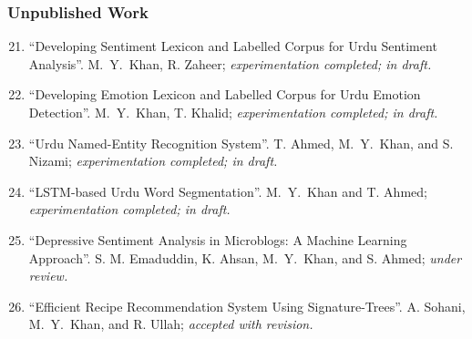 \documentclass[a4paper, 10pt]{article}
\begin{document}
\subsubsection*{{ Unpublished Work}}
\begin{enumerate}
\setcounter{enumi}{20}
\itemsep-4pt

\item ``Developing Sentiment Lexicon and Labelled Corpus for Urdu Sentiment Analysis''. \textcolor{NavyBlue}{M.~Y.~Khan}, R. Zaheer; \emph{\small experimentation completed; in draft.}

\item ``Developing Emotion Lexicon and Labelled Corpus for Urdu Emotion Detection''. \textcolor{NavyBlue}{M.~Y.~Khan}, T. Khalid; \emph{\small experimentation completed; in draft.}

\item ``Urdu Named-Entity Recognition System''. T. Ahmed, \textcolor{NavyBlue}{M.~Y.~Khan}, and S. Nizami; \emph{\small experimentation completed; in draft.}

\item ``LSTM-based Urdu Word Segmentation''. \textcolor{NavyBlue}{M.~Y.~Khan} and T. Ahmed; \emph{\small experimentation completed; in draft.}

\item ``Depressive Sentiment Analysis in Microblogs: A Machine Learning Approach''. S. M. Emaduddin, K. Ahsan, \textcolor{NavyBlue}{M.~Y.~Khan}, and S. Ahmed; \emph{\small under review.}

\item ``Efficient Recipe Recommendation System Using Signature-Trees''. A. Sohani, \textcolor{NavyBlue}{M.~Y.~Khan}, and R. Ullah;
\emph{\small accepted with revision.}




\end{enumerate}
\end{document}
